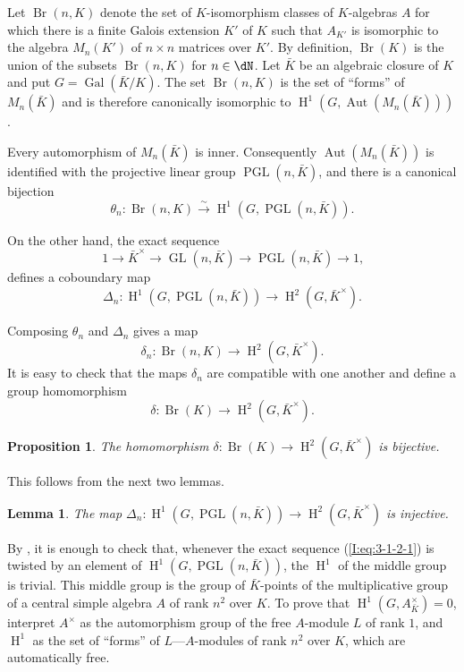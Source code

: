 \documentclass[12pt,oneside,english]{smfbook}
\DeclareMathOperator{\aut}{Aut}
\DeclareMathOperator{\br}{Br}
\DeclareMathOperator{\gal}{Gal}
\DeclareMathOperator{\gl}{GL}
\DeclareMathOperator{\h}{H}
\DeclareMathOperator{\pgl}{PGL}
\newcommand{\iso}{\xrightarrow\sim}
\newtheorem{proposition}[subsubsection]{Proposition}
\newtheorem{lemma}[subsubsection]{Lemma}
\begin{document}
Let $\br(n,K)$ denote the set of $K$-isomorphism classes of $K$-algebras $A$ for which there is a finite Galois extension $K'$ of $K$ such that $A_{K'}$ is isomorphic to the algebra $M_n(K')$ of $n\times n$ matrices over $K'$. By definition, $\br(K)$ is the union of the subsets $\br(n,K)$ for $n\in\dN$. Let $\bar K$ be an algebraic closure of $K$ and put $G=\gal(\bar K/K)$. The set $\br(n,K)$ is the set of ``forms'' of $M_n(\bar K)$ and is therefore canonically isomorphic to $\h^1\left(G,\aut(M_n(\bar K))\right)$.

Every automorphism of $M_n(\bar K)$ is inner. Consequently $\aut(M_n(\bar K))$ is identified with the projective linear group $\pgl(n,\bar K)$, and there is a canonical bijection
\[
  \theta_n : \br(n,K) \iso \h^1\left(G,\pgl(n,\bar K)\right)\text{.}
\]

On the other hand, the exact sequence
\begin{equation*}\tag{3.1.2.1}\label{I:eq:3-1-2-1}
  1 \to \bar K^\times \to \gl(n,\bar K) \to \pgl(n,\bar K) \to 1\text{,}
\end{equation*}
defines a coboundary map
\[
  \Delta_n : \h^1\left(G,\pgl(n,\bar K)\right) \to \h^2(G,\bar K^\times)\text{.}
\]

Composing $\theta_n$ and $\Delta_n$ gives a map
\[
  \delta_n : \br(n,K) \to \h^2(G,\bar K^\times)\text{.}
\]
It is easy to check that the maps $\delta_n$ are compatible with one another and define a group homomorphism
\[
  \delta : \br(K) \to \h^2(G,\bar K^\times)\text{.}
\]

\begin{proposition}\label{I:3-1-3}
The homomorphism $\delta:\br(K)\to\h^2(G,\bar K^\times)$ is bijective.
\end{proposition}

This follows from the next two lemmas.

\begin{lemma}\label{I:3-1-4}
The map $\Delta_n:\h^1\left(G,\pgl(n,\bar K)\right)\to\h^2(G,\bar K^\times)$ is injective.
\end{lemma}

By \cite[Corollary to Proposition I-44]{se94}, it is enough to check that, whenever the exact sequence (\ref{I:eq:3-1-2-1}) is twisted by an element of $\h^1\left(G,\pgl(n,\bar K)\right)$, the $\h^1$ of the middle group is trivial. This middle group is the group of $\bar K$-points of the multiplicative group of a central simple algebra $A$ of rank $n^2$ over $K$. To prove that $\h^1(G,A_{\bar K}^\times)=0$, interpret $A^\times$ as the automorphism group of the free $A$-module $L$ of rank $1$, and $\h^1$ as the set of ``forms'' of $L$---$A$-modules of rank $n^2$ over $K$, which are automatically free.
\end{document}
